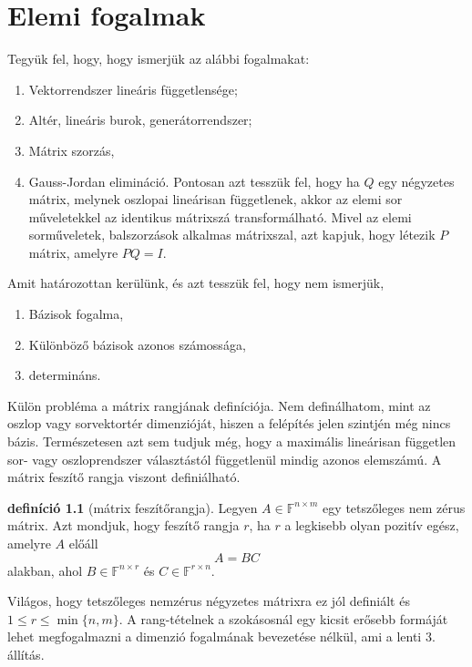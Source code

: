 \documentclass[9pt,showtrims]{memoir}
\theoremstyle{plain}
\theoremstyle{remark}
\theoremstyle{definition}
\newtheorem{definition}[proposition]{definíció}
\renewcommand{\mathbf}{\mathbb}
\begin{document}
\chapter{Elemi fogalmak}
Tegyük fel, hogy, hogy ismerjük az alábbi fogalmakat:
\begin{enumerate}
    \item Vektorrendszer lineáris függetlensége;
    \item Altér, lineáris burok, generátorrendszer;
    \item Mátrix szorzás,
    \item Gauss-Jordan elimináció. Pontosan azt tesszük fel, hogy ha $Q$ egy négyzetes mátrix, melynek oszlopai
        lineárisan függetlenek, akkor az elemi sor műveletekkel az identikus mátrixszá transformálható.
        Mivel az elemi sorműveletek, balszorzások alkalmas mátrixszal, 
        azt kapjuk, hogy létezik $P$ mátrix, amelyre $PQ=I$.
\end{enumerate}
Amit határozottan kerülünk, és azt tesszük fel, hogy nem ismerjük,
\begin{enumerate}
    \item Bázisok fogalma,
    \item Különböző bázisok azonos számossága,
    \item determináns.
\end{enumerate}
Külön probléma a mátrix rangjának definíciója.
Nem definálhatom, mint az oszlop vagy sorvektortér dimenzióját, hiszen a felépítés jelen szintjén még nincs bázis.
Természetesen azt sem tudjuk még, hogy a maximális lineárisan független sor- vagy oszloprendszer választástól függetlenül mindig azonos elemszámú.
A mátrix feszítő rangja viszont definiálható.
\begin{definition}[mátrix feszítőrangja]
    Legyen $A\in\mathbf{F}^{n\times m}$ egy tetszőleges nem zérus mátrix.
    Azt mondjuk, hogy feszítő rangja $r$, ha $r$ a legkisebb olyan pozitív egész, amelyre $A$ előáll
    \[
        A=BC
    \]
    alakban, ahol $B\in\mathbf{F}^{n\times r}$ és $C\in\mathbb{F}^{r\times n}$.
\end{definition}
Világos, hogy tetszőleges nemzérus négyzetes mátrixra ez jól definiált és $1\leq r \leq \min\{n,m\}$.
A rang-tételnek a szokásosnál egy kicsit erősebb formáját lehet megfogalmazni a dimenzió fogalmának bevezetése nélkül,
ami a lenti 3. állítás.
\end{document}
